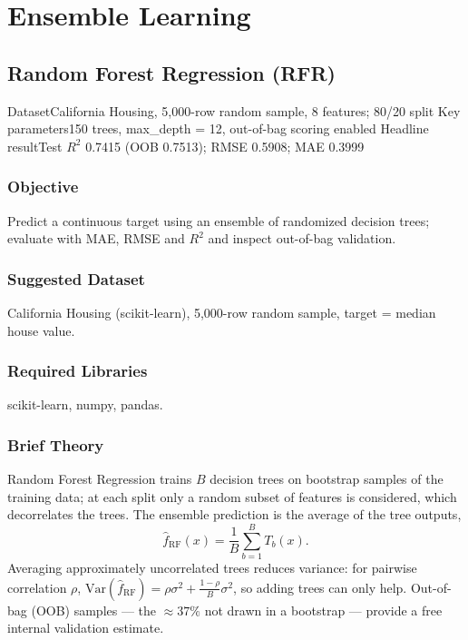 
\part{Ensemble Learning}

\chapter{Random Forest Regression (RFR)}\label{exp:08}


\quickfacts
  {Dataset}{California Housing, 5,000-row random sample, 8 features; 80/20 split}
  {Key parameters}{150 trees, max\_depth = 12, out-of-bag scoring enabled}
  {Headline result}{Test $R^2$ 0.7415 (OOB 0.7513); RMSE 0.5908; MAE 0.3999}

\section{Objective}
Predict a continuous target using an ensemble of randomized decision trees; evaluate with
MAE, RMSE and $R^2$ and inspect out-of-bag validation.

\section{Suggested Dataset}
California Housing (scikit-learn), 5,000-row random sample, target = median house value.

\section{Required Libraries}
scikit-learn, numpy, pandas.

\section{Brief Theory}
Random Forest Regression trains $B$ decision trees on bootstrap samples of the training data;
at each split only a random subset of features is considered, which decorrelates the trees.
The ensemble prediction is the average of the tree outputs,
\[
\hat{f}_{\mathrm{RF}}(x) = \frac{1}{B}\sum_{b=1}^{B} T_b(x) .
\]
Averaging approximately uncorrelated trees reduces variance: for pairwise correlation $\rho$,
$\mathrm{Var}(\hat{f}_{\mathrm{RF}}) = \rho\sigma^2 + \frac{1-\rho}{B}\sigma^2$, so adding
trees can only help. Out-of-bag (OOB) samples --- the $\approx 37\%$ not drawn in a bootstrap
--- provide a free internal validation estimate.

